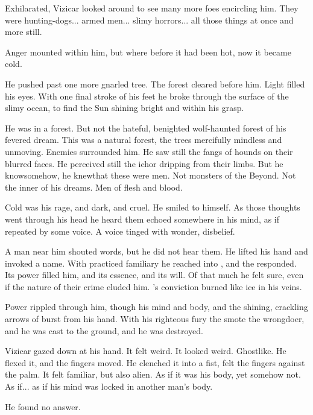 Exhilarated, Vizicar looked around to see many more foes encircling him. They were hunting-dogs... armed men... slimy horrors... all those things at once and more still.

Anger mounted within him, but where before it had been hot, now it became cold.  

He pushed past one more gnarled tree. The forest cleared before him. Light filled his eyes. With one final stroke of his feet he broke through the surface of the slimy ocean, to find the Sun shining bright and within his grasp. 

He was in a forest. But not the hateful, benighted wolf-haunted forest of his fevered dream. This was a natural forest, the trees mercifully mindless and unmoving. Enemies surrounded him. He saw still the fangs of hounds on their blurred faces. He perceived still the ichor dripping from their limbs. But he know\dash somehow, he knew\dash that these were men. Not monsters of the Beyond. Not the inner \daemons{} of his dreams. Men of flesh and blood.  

Cold was his rage, and dark, and cruel. He smiled to himself.  As those thoughts went through his head he heard them echoed somewhere in his mind, as if repeated by some voice. A voice tinged with wonder, disbelief. 

A man near him shouted words, but he did not hear them.  He lifted his hand and invoked a name. \ta{\Razilah!} With practiced familiary he reached into \iquin{}, and the \Sephirah{} responded. Its power filled him, and its essence, and its will.  Of that much he felt sure, even if the nature of their crime eluded him. \Razilah's conviction burned like ice in his veins. 

Power rippled through him, though his mind and body, and the shining, crackling arrows of \Razilah{} burst from his hand. With his righteous fury the \Sephirah{} smote the wrongdoer, and he was cast to the ground, and he was destroyed. 

Vizicar gazed down at his hand. It felt weird. It looked weird. Ghostlike. He flexed it, and the fingers moved. He clenched it into a fist, felt the fingers against the palm. It felt familiar, but also alien. As if it was his body, yet somehow not. As if... as if his mind was locked in another man's body. 

 He found no answer.  

